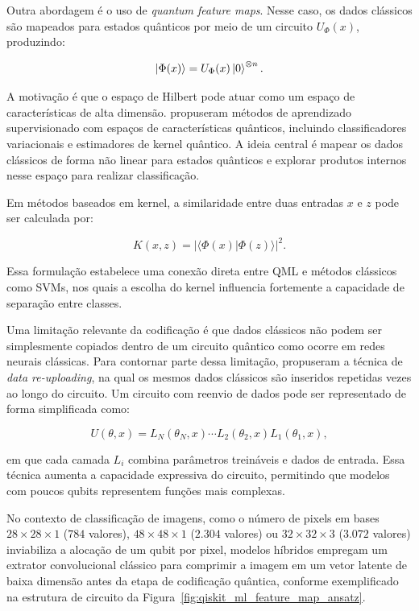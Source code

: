 \documentclass[
    12pt,
    openright,
    oneside,
    a4paper,
    english,
    brazil
]{abntex2}
\begin{document}
Outra abordagem é o uso de \textit{quantum feature maps}. Nesse caso, os dados clássicos são mapeados para estados quânticos por meio de um circuito \(U_{\Phi}(x)\), produzindo:

\[
\ket{\Phi(x)} =
U_{\Phi}(x)\ket{0}^{\otimes n}.
\]

A motivação é que o espaço de Hilbert pode atuar como um espaço de características de alta dimensão.  propuseram métodos de aprendizado supervisionado com espaços de características quânticos, incluindo classificadores variacionais e estimadores de kernel quântico. A ideia central é mapear os dados clássicos de forma não linear para estados quânticos e explorar produtos internos nesse espaço para realizar classificação.

Em métodos baseados em kernel, a similaridade entre duas entradas \(x\) e \(z\) pode ser calculada por:

\[
K(x,z) =
|\langle \Phi(x) | \Phi(z) \rangle|^2.
\]

Essa formulação estabelece uma conexão direta entre QML e métodos clássicos como SVMs, nos quais a escolha do kernel influencia fortemente a capacidade de separação entre classes.

Uma limitação relevante da codificação é que dados clássicos não podem ser simplesmente copiados dentro de um circuito quântico como ocorre em redes neurais clássicas. Para contornar parte dessa limitação,  propuseram a técnica de \textit{data re-uploading}, na qual os mesmos dados clássicos são inseridos repetidas vezes ao longo do circuito. Um circuito com reenvio de dados pode ser representado de forma simplificada como:

\[
U(\theta, x)
=
L_N(\theta_N, x)
\cdots
L_2(\theta_2, x)
L_1(\theta_1, x),
\]

em que cada camada \(L_i\) combina parâmetros treináveis e dados de entrada. Essa técnica aumenta a capacidade expressiva do circuito, permitindo que modelos com poucos qubits representem funções mais complexas.

No contexto de classificação de imagens, como o número de pixels em bases \(28 \times 28 \times 1\) (\(784\) valores), \(48 \times 48 \times 1\) (\(2.304\) valores) ou \(32 \times 32 \times 3\) (\(3.072\) valores) inviabiliza a alocação de um qubit por pixel, modelos híbridos empregam um extrator convolucional clássico para comprimir a imagem em um vetor latente de baixa dimensão antes da etapa de codificação quântica, conforme exemplificado na estrutura de circuito da Figura~\ref{fig:qiskit_ml_feature_map_ansatz}.
\end{document}
